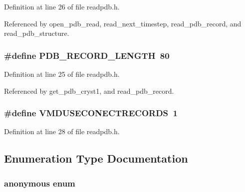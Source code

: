 Definition at line 26 of file readpdb.h.

Referenced by open\_\-pdb\_\-read, read\_\-next\_\-timestep, read\_\-pdb\_\-record, and read\_\-pdb\_\-structure.
\subsubsection{\setlength{\rightskip}{0pt plus 5cm}\#define PDB\_\-RECORD\_\-LENGTH\ 80}\label{readpdb_8h_a0}




Definition at line 25 of file readpdb.h.

Referenced by get\_\-pdb\_\-cryst1, and read\_\-pdb\_\-record.
\subsubsection{\setlength{\rightskip}{0pt plus 5cm}\#define VMDUSECONECTRECORDS\ 1}\label{readpdb_8h_a2}




Definition at line 28 of file readpdb.h.

\subsection{Enumeration Type Documentation}
\subsubsection{\setlength{\rightskip}{0pt plus 5cm}anonymous enum}\label{readpdb_8h_a19}


